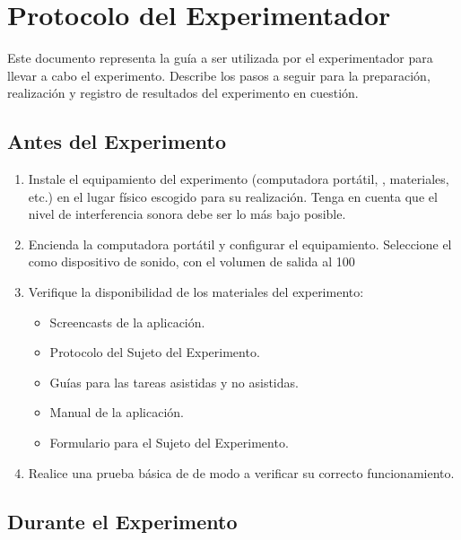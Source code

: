 \section{Protocolo del Experimentador}

Este documento representa la gu\'ia a ser utilizada por el experimentador para llevar a cabo el 
experimento. 
Describe los pasos a seguir para la preparaci\'on, realizaci\'on y registro de resultados del experimento en cuesti\'on.

\subsection{Antes del Experimento}

\begin{enumerate}
    \item Instale el equipamiento del experimento (computadora port\'atil, , materiales, etc.) en 
    el lugar f\'isico escogido para su realizaci\'on. Tenga en cuenta que el nivel de interferencia 
    sonora debe ser lo m\'as bajo posible.
    \item Encienda la computadora port\'atil y configurar el equipamiento. Seleccione el  como dispositivo de sonido, con el volumen de salida al 100%
    \item Verifique la disponibilidad de los materiales del experimento:
    \begin{itemize}
        \item Screencasts de la aplicaci\'on.
        \item Protocolo del Sujeto del Experimento.
        \item Gu\'ias para las tareas asistidas y no asistidas.
        \item Manual de la aplicaci\'on.
        \item Formulario para el Sujeto del Experimento.
    \end{itemize}
    \item Realice una prueba b\'asica de  de modo a verificar su 
    correcto funcionamiento. 
\end{enumerate}

\subsection{Durante el Experimento}

